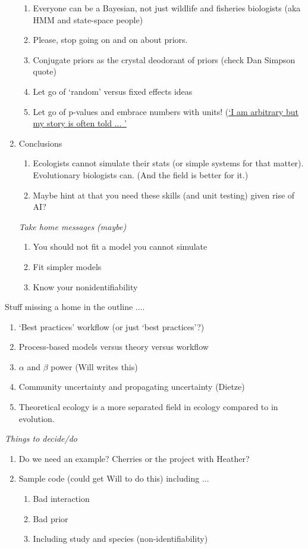 \documentclass[11pt]{article}
\begin{document}
\begin{enumerate}
\begin{enumerate}
\item Everyone can be a Bayesian, not just wildlife and fisheries biologists (aka HMM and state-space people)
\item Please, stop going on and on about priors. 
\item Conjugate priors as the crystal deodorant of priors (check Dan Simpson quote)
\item Let go of `random' versus fixed effects ideas
\item Let go of p-values and embrace numbers with units! (\href{https://www.youtube.com/watch?v=c3hxhv0lpI0}{`I am arbitrary but my story is often told ... '}
\end{enumerate}
\item Conclusions
\begin{enumerate}
\item Ecologists cannot simulate their stats (or simple systems for that matter). Evolutionary biologists can. (And the field is better for it.)
\item Maybe hint at that you need these skills (and unit testing) given rise of AI?
\end{enumerate}
\emph{Take home messages (maybe)}
\begin{enumerate}
\item You should not fit a model you cannot simulate
\item Fit simpler models
\item Know your nonidentifiability
\end{enumerate}
\end{enumerate}
\vspace{2ex}

Stuff missing a home in the outline .... 
\begin{enumerate}
\item `Best practices' workflow (or just `best practices'?)
\item  Process-based models versus theory versus workflow
\item $\alpha$ and $\beta$ power (Will writes this)
\item Community uncertainty and propagating uncertainty (Dietze)
\item Theoretical ecology is a more separated field in ecology compared to in evolution. 
\end{enumerate}


\emph{Things to decide/do}
\begin{enumerate}
\item Do we need an example? Cherries or the project with Heather?
\item Sample code (could get Will to do this) including ... 
\begin{enumerate}
\item Bad interaction
\item Bad prior
\item Including study and species (non-identifiability)
\end{enumerate}
\end{enumerate}
\end{document}
